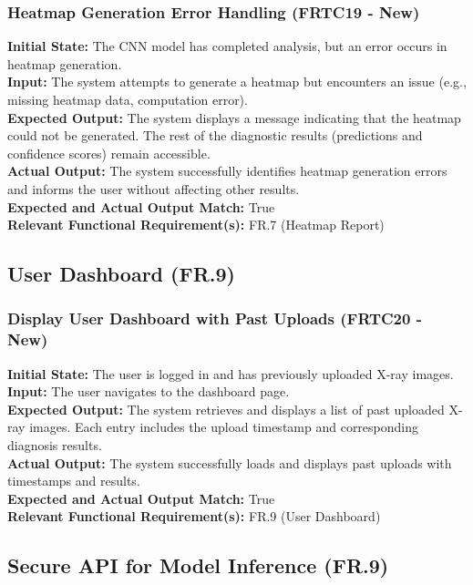 \documentclass[12pt, titlepage]{article}
\begin{document}
\subsubsection{Heatmap Generation Error Handling (FRTC19 - New)}
\textbf{Initial State:} The CNN model has completed analysis, but an error occurs in heatmap generation.\\
\textbf{Input:} The system attempts to generate a heatmap but encounters an issue (e.g., missing heatmap data, computation error).\\
\textbf{Expected Output:} The system displays a message indicating that the heatmap could not be generated. The rest of the diagnostic results (predictions and confidence scores) remain accessible.\\
\textbf{Actual Output:} The system successfully identifies heatmap generation errors and informs the user without affecting other results.\\
\textbf{Expected and Actual Output Match:} True\\
\textbf{Relevant Functional Requirement(s):} FR.7 (Heatmap Report)\\

\subsection{User Dashboard (FR.9)}
\subsubsection{Display User Dashboard with Past Uploads (FRTC20 - New)}
\textbf{Initial State:} The user is logged in and has previously uploaded X-ray images.\\
\textbf{Input:} The user navigates to the dashboard page.\\
\textbf{Expected Output:} The system retrieves and displays a list of past uploaded X-ray images. Each entry includes the upload timestamp and corresponding diagnosis results.\\
\textbf{Actual Output:} The system successfully loads and displays past uploads with timestamps and results.\\
\textbf{Expected and Actual Output Match:} True\\
\textbf{Relevant Functional Requirement(s):} FR.9 (User Dashboard)\\

\subsection{Secure API for Model Inference (FR.9)}
\end{document}

